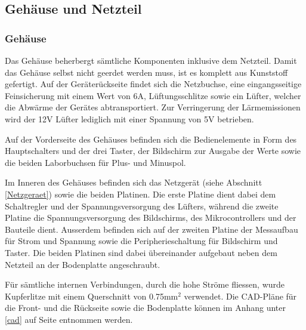 \subsection{Gehäuse und Netzteil}

\subsubsection{Gehäuse}
Das Gehäuse beherbergt sämtliche Komponenten inklusive dem Netzteil. Damit das Gehäuse selbst nicht geerdet werden muss, ist es komplett aus Kunststoff gefertigt. Auf der Geräterückseite findet sich die Netzbuchse, eine eingangsseitige Feinsicherung mit einem Wert von 6A, Lüftungsschlitze sowie ein Lüfter, welcher die Abwärme der Gerätes abtransportiert. Zur Verringerung der Lärmemissionen wird der 12V Lüfter lediglich mit einer Spannung von 5V betrieben.

Auf der Vorderseite des Gehäuses befinden sich die Bedienelemente in Form des Hauptschalters und der drei Taster, der Bildschirm zur Ausgabe der Werte sowie die beiden Laborbuchsen für Plus- und Minuspol.

Im Inneren des Gehäuses befinden sich das Netzgerät (siehe Abschnitt \ref{Netzgeraet}) sowie die beiden Platinen. Die erste Platine dient dabei dem Schaltregler und der Spannungsversorgung des Lüfters, während die zweite Platine die Spannungsversorgung des Bildschirms, des Mikrocontrollers und der Bauteile dient. Ausserdem befinden sich auf der zweiten Platine der Messaufbau für Strom und Spannung sowie die Peripherieschaltung für Bildschirm und Taster. Die beiden Platinen sind dabei übereinander aufgebaut neben dem Netzteil an der Bodenplatte angeschraubt.

Für sämtliche internen Verbindungen, durch die hohe Ströme fliessen, wurde Kupferlitze mit einem Querschnitt von 0.75mm$^2$ verwendet. Die CAD-Pläne für die Front- und die Rückseite sowie die Bodenplatte können im Anhang unter \ref{cad} auf Seite \pageref{cad} entnommen werden.


